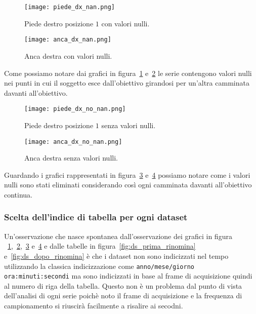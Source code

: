 \begin{figure}[H]
    \centering
    \texttt{[image: piede\_dx\_nan.png]}
    \caption{Piede destro posizione $1$ con valori nulli.}
    \label{fig:piede_dx_1_nan}
\end{figure}

\begin{figure}[H]
    \centering
    \texttt{[image: anca\_dx\_nan.png]}
    \caption{Anca destra con valori nulli.}
    \label{fig:anca_dx_nan}
\end{figure}

Come possiamo notare dai grafici in figura~\ref*{fig:piede_dx_1_nan} e~\ref*{fig:anca_dx_nan}
le serie contengono valori nulli nei punti in cui il soggetto esce dall'obiettivo girandosi
per un'altra camminata davanti all'obiettivo.

\begin{figure}[H]
    \centering
    \texttt{[image: piede\_dx\_no\_nan.png]}
    \caption{Piede destro posizione $1$ senza valori nulli.}
    \label{fig:piede_dx_1_no_nan}
\end{figure}

\begin{figure}[H]
    \centering
    \texttt{[image: anca\_dx\_no\_nan.png]}
    \caption{Anca destra senza valori nulli.}
    \label{fig:anca_dx_no_nan}
\end{figure}

Guardando i grafici rappresentati in figura~\ref*{fig:piede_dx_1_no_nan} e~\ref*{fig:anca_dx_no_nan}
possiamo notare come i valori nulli sono stati eliminati considerando così ogni camminata 
davanti all'obiettivo continua.


\subsubsection{Scelta dell'indice di tabella per ogni dataset}
Un'osservazione che nasce spontanea dall'osservazione dei grafici in figura
~\ref*{fig:piede_dx_1_nan},~\ref*{fig:anca_dx_nan},~\ref*{fig:piede_dx_1_no_nan}
e~\ref*{fig:anca_dx_no_nan} e dalle tabelle in figura~\ref*{fig:ds_prima_rinomina}
e~\ref*{fig:ds_dopo_rinomina} è che i dataset non sono indicizzati nel tempo utilizzando
la classica indicizzazione come \texttt{anno/mese/giorno ora:minuti:secondi} ma sono indicizzati
in base al frame di acquisizione quindi al numero di riga della tabella.
Questo non è un problema dal punto di vista dell'analisi di ogni serie poichè noto il frame
di acquisizione e la frequenza di campionamento si riuscirà facilmente a risalire ai secodni.

